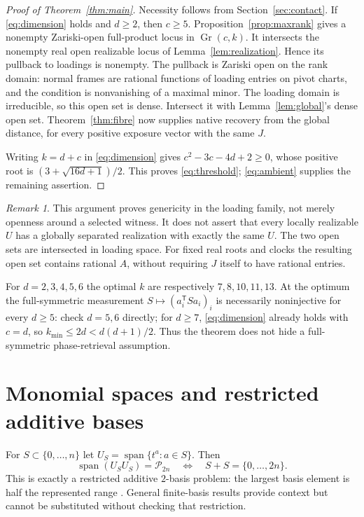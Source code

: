 \documentclass[11pt,reqno]{amsart}
\numberwithin{equation}{section}
\theoremstyle{definition}\newtheorem{definition}[theorem]{Definition}
\theoremstyle{remark}\newtheorem{remark}[theorem]{Remark}
\newcommand{\PP}{\mathcal P}
\newcommand{\Gr}{\operatorname{Gr}}
\newcommand{\Span}{\operatorname{span}}
\begin{document}
\begin{proof}[Proof of Theorem~\ref{thm:main}]
Necessity follows from Section~\ref{sec:contact}. If \eqref{eq:dimension} holds and $d\ge2$, then $c\ge5$. Proposition~\ref{prop:maxrank} gives a nonempty Zariski-open full-product locus in $\Gr(c,k)$. It intersects the nonempty real open realizable locus of Lemma~\ref{lem:realization}. Hence its pullback to loadings is nonempty. The pullback is Zariski open on the rank domain: normal frames are rational functions of loading entries on pivot charts, and the condition is nonvanishing of a maximal minor. The loading domain is irreducible, so this open set is dense. Intersect it with Lemma~\ref{lem:global}'s dense open set. Theorem~\ref{thm:fibre} now supplies native recovery from the global distance, for every positive exposure vector with the same $J$.

Writing $k=d+c$ in \eqref{eq:dimension} gives $c^2-3c-4d+2\ge0$, whose positive root is $(3+\sqrt{16d+1})/2$. This proves \eqref{eq:threshold}; \eqref{eq:ambient} supplies the remaining assertion.
\end{proof}

\begin{remark}
This argument proves genericity in the loading family, not merely openness around a selected witness. It does not assert that every locally realizable $U$ has a globally separated realization with exactly the same $U$. The two open sets are intersected in loading space. For fixed real roots and clocks the resulting open set contains rational $A$, without requiring $J$ itself to have rational entries.
\end{remark}
For $d=2,3,4,5,6$ the optimal $k$ are respectively $7,8,10,11,13$. At the optimum the full-symmetric measurement $S\mapsto(a_i^{\mathsf T}Sa_i)_i$ is necessarily noninjective for every $d\ge5$: check $d=5,6$ directly; for $d\ge7$, \eqref{eq:dimension} already holds with $c=d$, so $k_{\min}\le2d<d(d+1)/2$. Thus the theorem does not hide a full-symmetric phase-retrieval assumption.

\section{Monomial spaces and restricted additive bases}\label{sec:monomial}
For $S\subset\{0,\ldots,n\}$ let $U_S=\Span\{t^a:a\in S\}$. Then
\begin{equation}\label{eq:sumset}
 \Span(U_SU_S)=\PP_{2n}\quad\Longleftrightarrow\quad
 S+S=\{0,\ldots,2n\}.
\end{equation}
This is exactly a restricted additive $2$-basis problem: the largest basis element is half the represented range \cite{Kohonen14}. General finite-basis results \cite{Yu,Kohonen17} provide context but cannot be substituted without checking that restriction.
\end{document}
